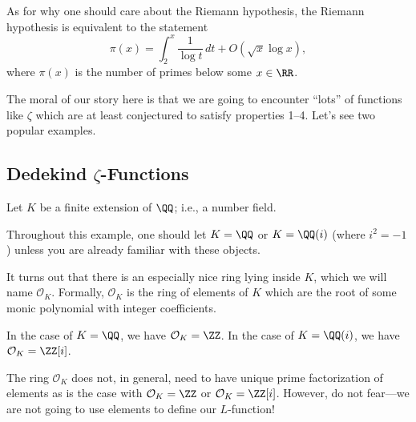 \documentclass{article}
\begin{document}
\begin{remark}
	As for why one should care about the Riemann hypothesis, the Riemann hypothesis is equivalent to the statement
	\[\pi(x)=\int_2^x\frac1{\log t}\,dt+O\left(\sqrt x\log x\right),\]
	where $\pi(x)$ is the number of primes below some $x\in\RR$.
\end{remark}
The moral of our story here is that we are going to encounter ``lots'' of functions like $\zeta$ which are at least conjectured to satisfy properties 1--4. Let's see two popular examples.

\subsection{Dedekind \texorpdfstring{$\zeta$}{ Z}-Functions}
Let $K$ be a finite extension of $\QQ$; i.e., a number field.
\begin{example}
	Throughout this example, one should let $K=\QQ$ or $K=\QQ(i)$ (where $i^2=-1$) unless you are already familiar with these objects.
\end{example}
It turns out that there is an especially nice ring lying inside $K$, which we will name $\mathcal O_K$. Formally, $\mathcal O_K$ is the ring of elements of $K$ which are the root of some monic polynomial with integer coefficients.
\begin{example}
	In the case of $K=\QQ$, we have $\mathcal O_K=\ZZ$. In the case of $K=\QQ(i)$, we have $\mathcal O_K=\ZZ[i]$.
\end{example}
The ring $\mathcal O_K$ does not, in general, need to have unique prime factorization of elements as is the case with $\mathcal O_K=\ZZ$ or $\mathcal O_K=\ZZ[i]$. However, do not fear---we are not going to use elements to define our $L$-function!
\end{document}
